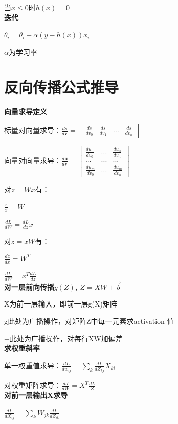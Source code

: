 \documentclass[UTF8]{ctexart}
\begin{document}
  \quad 当$x \leq 0$时$h(x) = 0$\\
\textbf{迭代}

  $\theta_i = \theta_i + \alpha(y - h(x))x_i$
  
  \quad $\alpha$为学习率

\section{反向传播公式推导}
\noindent \textbf{向量求导定义}

  标量对向量求导：$\frac{ds}{d\textbf{v}} = \begin{bmatrix}
    \frac{ds}{dv_0} & \frac{ds}{dv_1} & ... & \frac{ds}{dv_n}
    \end{bmatrix}$

  向量对向量求导：$\frac{d\textbf{u}}{d\textbf{v}} = \begin{bmatrix}
    \frac{du_0}{dv_0} & ... & \frac{du_0}{dv_n} \\
    ... & ... & ... \\
    \frac{du_m}{dv_0} & ... & \frac{du_m}{dv_n}
    \end{bmatrix}$
  
  对$z = Wx$有：
  
  \quad $\frac{z}{x} = W$
  
  \quad $\frac{dL}{dW} = \frac{dL}{dz}x$

  对$z = xW$有：
  
  \quad $\frac{dz}{dx} = W^T$

  \quad $\frac{dL}{dW} = x^T\frac{dL}{dz}$\\
\textbf{对一层前向传播$g(Z)$, $Z = XW + \vec{b}$}

  X为前一层输入，即前一层g(X)矩阵
  
  g此处为广播操作，对矩阵Z中每一元素求activation 值
  
  +此处为广播操作，对每行XW加偏差\\
\textbf{求权重斜率}
  
  单一权重值求导：$\frac{dL}{dw_{ij}} = \sum_k \frac{dL}{dZ_{kj}} X_{ki}$

  对权重矩阵求导：$\frac{dJ}{dW} = X^T\frac{dL}{Z}$\\
\textbf{对前一层输出X求导}

  $\frac{dL}{dX_{ij}} = \sum_k W_{jk}\frac{dL}{dZ_{ik}}$
\end{document}
